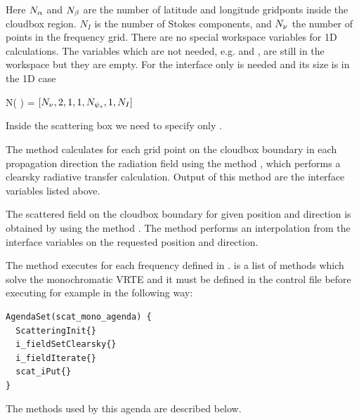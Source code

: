 Here $N_{\alpha}$ and $N_{\beta}$ are the number of latitude and longitude
gridponts inside the cloudbox region.  $N_I$ is the number of Stokes components, and $N_{\nu}$
the number of points in the frequency grid.  There are no special
workspace variables for 1D calculations. The variables which are not
needed, e.g.  and , are
still in the workspace but they are empty. For the interface only
 is needed and its size is in the 1D case
\begin{center}
  N(  ) = $[N_{\nu}, 2, 1, 1, N_{{\psi_s}}, 1, N_I]$
\end{center}  
Inside the scattering box we need to specify only
.



 The method
 calculates for each grid point on the
cloudbox boundary in each propagation direction the radiation field
using the method , which performs a clearsky
radiative transfer calculation.  Output of this method are the
interface variables listed above.

 The scattered field on
the cloudbox boundary for given position and direction is obtained by
using the method . The method performs
an interpolation from the interface variables on the requested
position and direction.


\label{sec:scattering:scat_mono_ag}

The method  executes
 for each frequency defined in
.  is a list of methods which solve the
monochromatic VRTE and it must be defined in the control file before
executing  for example in the following way:

\begin{verbatim}
AgendaSet(scat_mono_agenda) {
  ScatteringInit{}
  i_fieldSetClearsky{}
  i_fieldIterate{}
  scat_iPut{}
}
\end{verbatim}

\noindent
The methods used by this agenda are described below.

 

